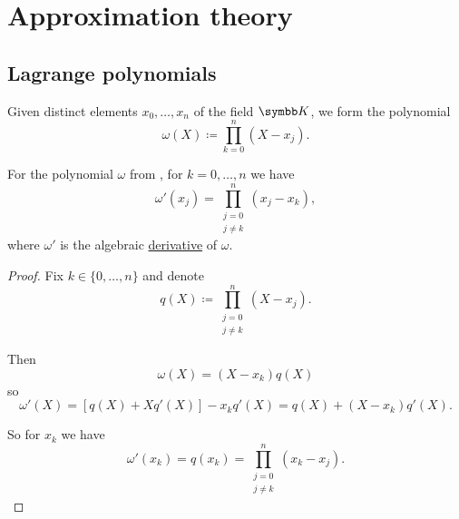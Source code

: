 \section{Approximation theory}\label{sec:approximation_theory}
\subsection{Lagrange polynomials}\label{subsec:lagrange_polynomials}

\begin{definition}\label{def:omega_polynomial}
  Given distinct elements \( x_0, \ldots, x_n \) of the field \( \BK \), we form the polynomial
  \begin{equation*}
    \omega(X) \coloneqq \prod_{k=0}^n (X - x_j).
  \end{equation*}
\end{definition}

\begin{proposition}\label{thm:omega_polynomial_derivative}
  For the polynomial \( \omega \) from , for \( k = 0, \ldots, n \) we have
  \begin{equation*}
    \omega'(x_j) = \prod_{\substack{j = 0 \\ j \neq k}}^n (x_j - x_k),
  \end{equation*}
  where \( \omega' \) is the algebraic \hyperref[def:algebraic_derivative]{derivative} of \( \omega \).
\end{proposition}
\begin{proof}
  Fix \( k \in \{ 0, \ldots, n \} \) and denote
  \begin{equation*}
    q(X) \coloneqq \prod_{\substack{j = 0 \\ j \neq k}}^n (X - x_j).
  \end{equation*}

  Then
  \begin{equation*}
    \omega(X) = (X - x_k) q(X)
  \end{equation*}
  so
  \begin{equation*}
    \omega'(X) = [q(X) + X q'(X)] - x_k q'(X) = q(X) + (X - x_k) q'(X).
  \end{equation*}

  So for \( x_k \) we have
  \begin{equation*}
    \omega'(x_k) = q(x_k) = \prod_{\substack{j = 0 \\ j \neq k}}^n (x_k - x_j).
  \end{equation*}
\end{proof}

